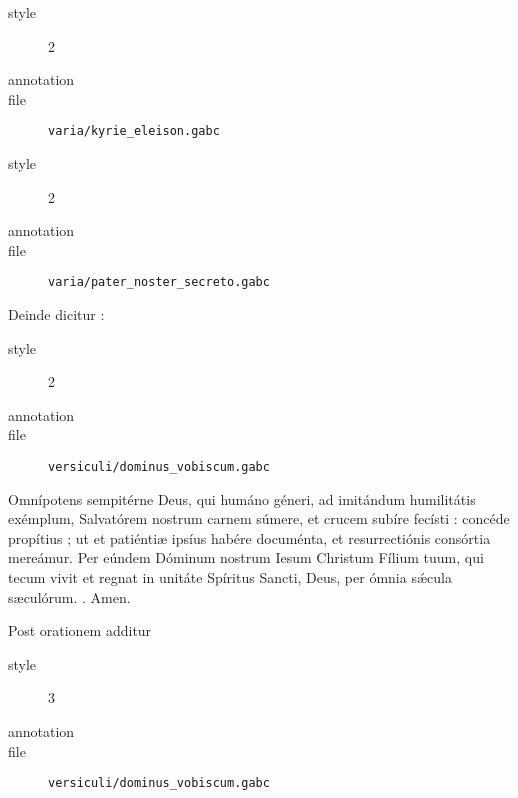 \begin{gabc}
\begin{description}
\item[style] 2
\item[annotation] 
\item[file] \verb|varia/kyrie_eleison.gabc|
\end{description}
\end{gabc}

\begin{gabc}
\begin{description}
\item[style] 2
\item[annotation] 
\item[file] \verb|varia/pater_noster_secreto.gabc|
\end{description}
\end{gabc}

\begin{rubric}
Deinde dicitur :
\end{rubric}

\begin{gabc}
\begin{description}
\item[style] 2
\item[annotation] 
\item[file] \verb|versiculi/dominus_vobiscum.gabc|
\end{description}
\end{gabc}


\begin{lectio}
Omn\'ipotens sempit\'erne Deus, qui hum\'ano g\'eneri, ad imit\'andum humilit\'atis ex\'emplum, Salvat\'orem nostrum carnem s\'umere,
et crucem sub\'ire fec\'isti : conc\'ede prop\'itius ; ut et pati\'enti{\ae} ips\'ius hab\'ere docum\'enta,
et resurrecti\'onis cons\'ortia mere\'amur.
Per e\'undem D\'ominum nostrum Iesum Christum F\'ilium tuum,
qui tecum vivit et regnat in unit\'ate Sp\'iritus Sancti, Deus, per \'omnia s\'{\ae}cula s{\ae}cul\'orum.
\R. Amen.
\end{lectio}

\begin{rubric}
Post orationem additur
\end{rubric}

\begin{gabc}
\begin{description}
\item[style] 3
\item[annotation] 
\item[file] \verb|versiculi/dominus_vobiscum.gabc|
\end{description}
\end{gabc}

